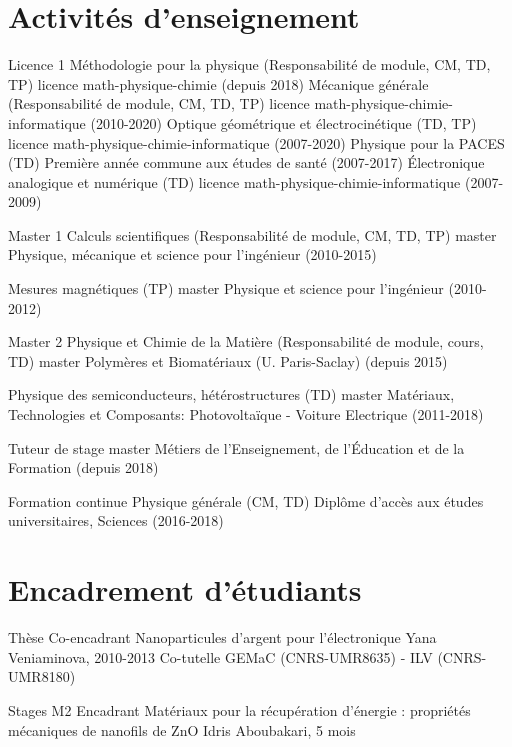 \section{Activités d'enseignement}
\cventry
	{Licence 1}
	{Méthodologie pour la physique (Responsabilité de module, CM, TD, TP)}
	{licence math-physique-chimie}
	{(depuis 2018)}{}{}
\cventry
	{}
	{Mécanique générale (Responsabilité de module, CM, TD, TP)}
	{licence math-physique-chimie-informatique}
	{(2010-2020)}{}{}
\cventry
	{}
	{Optique géométrique et électrocinétique (TD, TP)}
	{licence math-physique-chimie-informatique}
	{(2007-2020)}{}{}	
\cventry
	{}
	{Physique pour la PACES (TD)}
	{Première année commune aux études de santé}
	{(2007-2017)}{}{}
\cventry
	{}
	{\'Electronique analogique et numérique (TD)}
	{licence math-physique-chimie-informatique}
	{(2007-2009)}{}{}

\cventry
	{Master 1}
	{Calculs scientifiques (Responsabilité de module, CM, TD, TP)}
	{master Physique, mécanique et science pour l'ingénieur}
	{(2010-2015)}{}{}
	
\cventry%
	{}	%
	{Mesures magnétiques (TP)}
	{master Physique et science pour l'ingénieur}
	{(2010-2012)}{}{}	

\cventry
	{Master 2}
	{Physique et Chimie de la Matière (Responsabilité de module, cours, TD)}
	{master Polymères et Biomatériaux (U. Paris-Saclay)}
	{(depuis 2015)}
	{}{}

\cventry
	{}
	{Physique des semiconducteurs, hétérostructures (TD)}
	{master Matériaux, Technologies et Composants: Photovoltaïque - Voiture Electrique}
	{(2011-2018)}
	{}{}

\iffalse
\cventry
	{}
	{Expériences récentes en Physique quantique (TD)}
	{master Nanosciences (U. Paris-Saclay)}
	{(2013)}
	{}{}
\fi

\cventry
	{}
	{Tuteur de stage}
	{master Métiers de l'Enseignement, de l'\'Education et de la Formation}
	{(depuis 2018)}
	{}{}

\cventry
	{Formation continue}
	{Physique générale (CM, TD)}
	{Diplôme d'accès aux études universitaires, Sciences}
	{(2016-2018)}{}{}


\section{Encadrement d'étudiants}
\cventry
	{Thèse}
	{Co-encadrant}
	{Nanoparticules d'argent pour l'électronique}
	{Yana Veniaminova, 2010-2013}
	{Co-tutelle GEMaC (CNRS-UMR8635) - ILV (CNRS-UMR8180)}{}

\cventry
	{Stages M2}
	{Encadrant}
	{Matériaux pour la récupération d’énergie : propriétés mécaniques de nanofils de ZnO}
	{Idris Aboubakari, 5 mois}	
	{}{}
	
